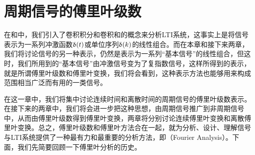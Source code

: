 \chapter{周期信号的傅里叶级数}
在和中，我们引入了卷积积分和卷积和的概念来分析LTI系统，这事实上是将信号表示为一系列冲激函数$\updelta(t)$或单位序列$\updelta(k)$的线性组合。而在本章和接下来两章，我们将讨论信号的另一种表示，仍然是表示为一系列“基本信号”的线性组合，但这时，我们所用到的“基本信号”由冲激信号变为了复指数信号，这样所得到的表示，就是所谓傅里叶级数和傅里叶变换，我们将会看到，这种表示方法也能够用来构成范围相当广泛而有用的一类信号。

在这一章中，我们将集中讨论连续时间和离散时间的周期信号的傅里叶级数表示。在接下来的两章中，我们将会进一步把这种思想，由周期信号推广到非周期信号中，从而由傅里叶级数得到傅里叶变换，两章将分别讨论连续傅里叶变换和离散傅里叶变换。总之，傅里叶级数和傅里叶方法合在一起，就为分析、设计、理解信号与LTI系统提供了一种最有力和最重要的分析方法，即（Fourier Analysis）。下面，我们先简要回顾一下傅里叶分析的历史。

